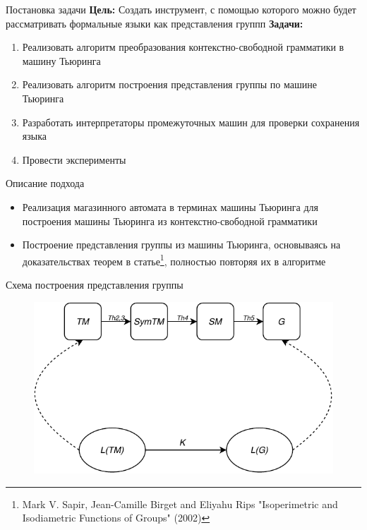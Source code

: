 \documentclass[xcolor=table]{beamer}
\begin{document}
\begin{frame}[fragile]{Постановка задачи}
\textbf{Цель:} Создать инструмент, с помощью которого можно будет рассматривать формальные языки как представления группп
\newline
\newline
\textbf{Задачи:}
    \begin{enumerate}
    \item Реализовать алгоритм преобразования контекстно-свободной грамматики в машину Тьюринга
    \item Реализовать алгоритм построения представления группы по машине Тьюринга
    \item Разработать интерпретаторы промежуточных машин для проверки сохранения языка
    \item Провести эксперименты
\end{enumerate}
\end{frame}

\begin{frame}[fragile]{Описание подхода}
    \begin{itemize}
        \item Реализация магазинного автомата в терминах машины Тьюринга для построения машины Тьюринга из контекстно-свободной грамматики
        \item Построение представления группы из машины Тьюринга, основываясь на доказательствах теорем в статье\footnote{Mark V. Sapir, Jean-Camille Birget and Eliyahu Rips "Isoperimetric and Isodiametric Functions of Groups" (2002)}, полностью повторяя их в алгоритме
    \end{itemize}
\end{frame}

\begin{frame}[fragile]{Схема построения представления группы}
\begin{figure}[H]
  \centering
  \includegraphics[width=120mm]{pictures/2.pdf}
 \end{figure}
\end{frame}
\end{document}
